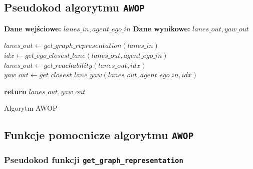 \subsection{Pseudokod algorytmu \texttt{AWOP}}

\begin{pseudokod}[H]
    \SetAlgoLined
    \DontPrintSemicolon
    \textbf{Dane wejściowe:} $lanes\_in, agent\_ego\_in$\;
    \textbf{Dane wynikowe:} $lanes\_out, yaw\_out$\;
    
    \BlankLine
    $lanes\_out \leftarrow get\_graph\_representation(lanes\_in)$
    $idx \leftarrow get\_ego\_closest\_lane(lanes\_out, agent\_ego\_in)$
    $lanes\_out \leftarrow get\_reachability(lanes\_out, idx)$
    $yaw\_out \leftarrow get\_closest\_lane\_yaw(lanes\_out, agent\_ego\_in, idx)$
    
    \BlankLine
    \textbf{return} $lanes\_out, yaw\_out$

    \caption{Algorytm AWOP}
\end{pseudokod}

\newpage

\subsection{Funkcje pomocnicze algorytmu \texttt{AWOP}}

\subsubsection{Pseudokod funkcji \texttt{get\_graph\_representation}}

